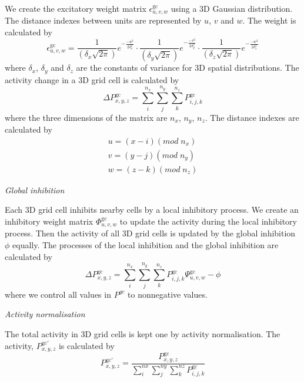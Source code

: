 We create the excitatory weight matrix $\epsilon_{u,v,w}^{\text{gc}}$ using a 3D Gaussian distribution. 
The distance indexes between units are represented by $u$, $v$ and $w$. 
The weight is calculated by
%
\begin{equation}\label{eq:weight}
	\epsilon_{u,v,w}^{\text{gc}} = 
		\frac{1}{(\delta_x \sqrt{2 \pi})} e^{-\frac{-u^2}{2\delta_x^2}} \cdot
		\frac{1}{(\delta_y \sqrt{2 \pi})} e^{-\frac{-v^2}{2\delta_y^2}}
		\cdot \frac{1}{(\delta_z \sqrt{2 \pi})} e^{-\frac{-w^2}{2\delta_z^2}}
\end{equation}
%
where $\delta_x$, $\delta_y$ and $\delta_z$ are the constants of variance for 3D spatial distributions.
The activity change in a 3D grid cell is calculated by
\begin{equation}\label{eq:activity_change}
	\Delta P_{x,y,z}^{\text{gc}} = \sum_{i}^{n_x} \sum_{j}^{n_y} \sum_{k}^{n_z} P_{i,j,k}^{\text{gc}}
\end{equation}
%
where the three dimensions of the matrix are $n_x$, $n_y$, $n_z$.
The distance indexes are calculated by
\begin{equation}
\begin{aligned}
	u = (x - i) (mod \; n_x) \\
	v = (y - j) (mod \; n_y) \\
	w = (z - k) (mod \; n_z)
\end{aligned}
\end{equation}

\textit{Global inhibition}

Each 3D grid cell inhibits nearby cells by a local inhibitory process. 
We create an inhibitory weight matrix $\Phi_{u,v,w}^{\text{gc}}$ to update the activity during the local inhibitory process. 
Then the activity of all 3D grid cells is updated by the global inhibition $\phi$ equally. The processes of the local inhibition and the global inhibition are calculated by
%
\begin{equation}
	\Delta P_{x,y,z}^{\text{gc}} = 
		\sum_{i}^{n_x}
		\sum_{j}^{n_y}
		\sum_{k}^{n_z}
		P_{i,j,k}^{\text{gc}}
		\Psi_{u,v,w}^{\text{gc}} - \phi
\end{equation}
% 
where we control all values in $P^{gc}$ to nonnegative values.


\textit{Activity normalisation}

The total activity in 3D grid cells is kept one by activity normalisation. 
The activity, $P_{x,y,z}^{\text{gc}'}$ is calculated by
%
\begin{equation}
	P_{x,y,z}^{\text{gc}'} = 
		\frac{P_{x,y,z}^{\text{gc}}}
			{
				\sum_{i}^{nx}
				\sum_{j}^{ny}
				\sum_{k}^{nz}
				P_{i,j,k}^{\text{gc}}
			}
\end{equation}

